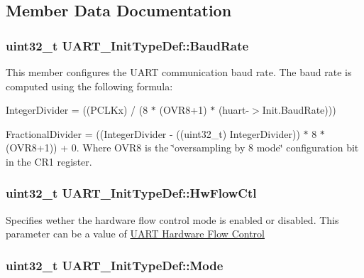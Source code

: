 \subsection{Member Data Documentation}
\hypertarget{struct_u_a_r_t___init_type_def_ae460c2e4d7ddc67bca9f5756f45b1d83}{
\subsubsection[{Baud\-Rate}]{\setlength{\rightskip}{0pt plus 5cm}uint32\-\_\-t U\-A\-R\-T\-\_\-\-Init\-Type\-Def\-::\-Baud\-Rate}}\label{struct_u_a_r_t___init_type_def_ae460c2e4d7ddc67bca9f5756f45b1d83}
This member configures the U\-A\-R\-T communication baud rate. The baud rate is computed using the following formula\-:
\begin{DoxyItemize}
\item Integer\-Divider = ((P\-C\-L\-Kx) / (8 $\ast$ (O\-V\-R8+1) $\ast$ (huart-\/$>$Init.\-Baud\-Rate)))
\item Fractional\-Divider = ((Integer\-Divider -\/ ((uint32\-\_\-t) Integer\-Divider)) $\ast$ 8 $\ast$ (O\-V\-R8+1)) + 0. Where O\-V\-R8 is the \char`\"{}oversampling by 8 mode\char`\"{} configuration bit in the C\-R1 register. 
\end{DoxyItemize}\hypertarget{struct_u_a_r_t___init_type_def_adbf4734130666b94201c6658464c1622}{
\subsubsection[{Hw\-Flow\-Ctl}]{\setlength{\rightskip}{0pt plus 5cm}uint32\-\_\-t U\-A\-R\-T\-\_\-\-Init\-Type\-Def\-::\-Hw\-Flow\-Ctl}}\label{struct_u_a_r_t___init_type_def_adbf4734130666b94201c6658464c1622}
Specifies wether the hardware flow control mode is enabled or disabled. This parameter can be a value of \hyperlink{group___u_a_r_t___hardware___flow___control}{U\-A\-R\-T Hardware Flow Control} \hypertarget{struct_u_a_r_t___init_type_def_ab2ee6ea5a5d4ca5ee6b759be197bcfcb}{
\subsubsection[{Mode}]{\setlength{\rightskip}{0pt plus 5cm}uint32\-\_\-t U\-A\-R\-T\-\_\-\-Init\-Type\-Def\-::\-Mode}}\label{struct_u_a_r_t___init_type_def_ab2ee6ea5a5d4ca5ee6b759be197bcfcb}
